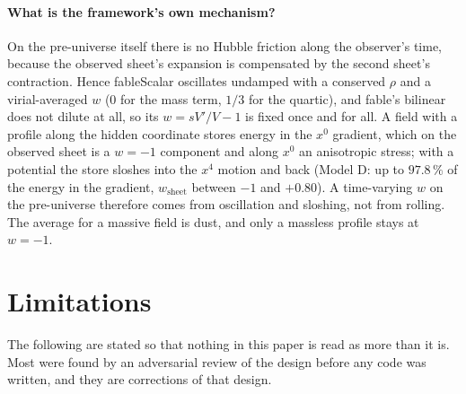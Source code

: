 \documentclass[11pt,a4paper]{article}
\newcommand{\fableScalar}{\textsf{fableScalar}}
\newcommand{\fable}{\textsf{fable}}
\begin{document}
\paragraph{What is the framework's own mechanism?} On the pre-universe itself there is no Hubble
friction along the observer's time, because the observed sheet's expansion is compensated by the
second sheet's contraction. Hence \fableScalar{} oscillates undamped with a conserved $\rho$ and a
virial-averaged $w$ (0 for the mass term, $1/3$ for the quartic), and \fable's bilinear does not
dilute at all, so its $w=sV'/V-1$ is fixed once and for all. A field with a profile along the
hidden coordinate stores energy in the $x^0$ gradient, which on the observed sheet is a $w=-1$
component and along $x^0$ an anisotropic stress; with a potential the store sloshes into the
$x^4$ motion and back (Model D: up to $97.8\,\%$ of the energy in the gradient, $w_{\mathrm{sheet}}$
between $-1$ and $+0.80$). A time-varying $w$ on the pre-universe therefore comes from oscillation
and sloshing, not from rolling. The average for a massive field is dust, and only a massless
profile stays at $w=-1$.

\section{Limitations}\label{sec:limits}

The following are stated so that nothing in this paper is read as more than it is. Most were
found by an adversarial review of the design before any code was written, and they are
corrections of that design.
\end{document}
